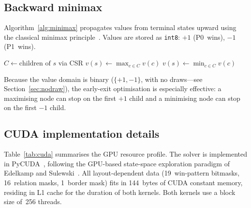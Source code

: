 \documentclass[11pt,a4paper]{article}
\begin{document}
\subsection{Backward minimax}\label{sec:minimax}

Algorithm~\ref{alg:minimax} propagates values from terminal states
upward using the classical minimax principle~\cite{knuth1975}.
Values are stored as \texttt{int8}: $+1$ (P0~wins), $-1$ (P1~wins).

\begin{algorithm}[t]
\caption{Backward minimax (value propagation)}\label{alg:minimax}
\begin{algorithmic}[1]
   
    \State $C \gets \text{children of } s$ via CSR
      \State $v(s) \gets \max_{c \in C} v(c)$
    \Else
      \State $v(s) \gets \min_{c \in C} v(c)$
    \EndIf
  \EndFor
\EndFor
\end{algorithmic}
\end{algorithm}

Because the value domain is binary ($\{+1, -1\}$, with no draws---see
Section~\ref{sec:nodraw}), the early-exit optimisation is especially
effective: a maximising node can stop on the first $+1$ child and a
minimising node can stop on the first $-1$ child.

\subsection{CUDA implementation details}

Table~\ref{tab:cuda} summarises the GPU resource profile.  The solver is
implemented in PyCUDA~\cite{klockner2012}, following the GPU-based
state-space exploration paradigm of Edelkamp and
Sulewski~\cite{edelkamp2010}.  All layout-dependent data (19~win-pattern
bitmasks, 16~relation masks, 1~border mask) fits in 144~bytes of CUDA
constant memory, residing in L1 cache for the duration of both kernels.
Both kernels use a block size of~256 threads.
\end{document}
